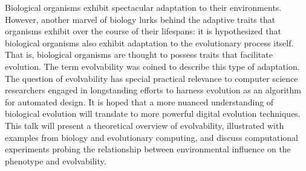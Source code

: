 Biological organisms exhibit spectacular adaptation to their environments. However, another marvel of biology lurks behind the adaptive traits that organisms exhibit over the course of their lifespans: it is hypothesized that biological organisms also exhibit adaptation to the evolutionary process itself. That is, biological organisms are thought to possess traits that facilitate evolution. The term evolvability was coined to describe this type of adaptation. The question of evolvability has special practical relevance to computer science researchers engaged in longstanding efforts to harness evolution as an algorithm for automated design. It is hoped that a more nuanced understanding of biological evolution will translate to more powerful digital evolution techniques. This talk will present a theoretical overview of evolvability, illustrated with examples from biology and evolutionary computing, and discuss computational experiments probing the relationship between environmental influence on the phenotype and evolvability.
